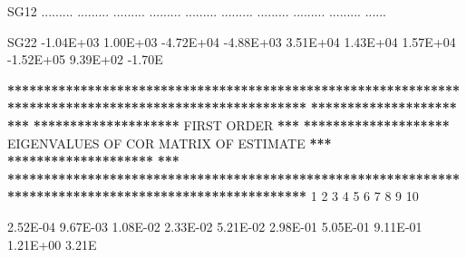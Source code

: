 \documentclass[
  11pt,
  krantz2,
  a4paper]{krantz}
\newenvironment{Shaded}{\begin{snugshade}}{\end{snugshade}}
\newcommand{\DecValTok}[1]{\textcolor[rgb]{0.00,0.00,0.81}{#1}}
\newcommand{\ErrorTok}[1]{\textcolor[rgb]{0.64,0.00,0.00}{\textbf{#1}}}
\newcommand{\FloatTok}[1]{\textcolor[rgb]{0.00,0.00,0.81}{#1}}
\newcommand{\NormalTok}[1]{#1}
\newcommand{\OperatorTok}[1]{\textcolor[rgb]{0.81,0.36,0.00}{\textbf{#1}}}
\newcommand{\StringTok}[1]{\textcolor[rgb]{0.31,0.60,0.02}{#1}}
\theoremstyle{definition}
\theoremstyle{definition}
\theoremstyle{definition}
\theoremstyle{remark}
\begin{document}
\begin{Shaded}
\begin{Highlighting}[]
\NormalTok{SG12   ......... ......... ......... ......... ......... ......... ......... ......... ......... ......}
                                                                                                       
\NormalTok{SG22   }\FloatTok{{-}1.04E+03}  \FloatTok{1.00E+03} \FloatTok{{-}4.72E+04} \FloatTok{{-}4.88E+03}  \FloatTok{3.51E+04}  \FloatTok{1.43E+04}  \FloatTok{1.57E+04} \FloatTok{{-}1.52E+05}  \FloatTok{9.39E+02} \FloatTok{{-}1.70}\NormalTok{E}
                                                                                                       
                                                                                                       
\OperatorTok{**}\ErrorTok{*****************************************************************************************************}
\ErrorTok{********************}\StringTok{                                                                                }\ErrorTok{***}
\ErrorTok{********************}\StringTok{                                   }\NormalTok{FIRST ORDER                                  }\OperatorTok{**}\ErrorTok{*}
\ErrorTok{********************}\StringTok{                      }\NormalTok{EIGENVALUES OF COR MATRIX OF ESTIMATE                     }\OperatorTok{**}\ErrorTok{*}
\ErrorTok{********************}\StringTok{                                                                                }\ErrorTok{***}
\ErrorTok{*******************************************************************************************************}
\StringTok{                                                                                                       }
\StringTok{                                                                                                       }
\StringTok{            }\DecValTok{1}         \DecValTok{2}         \DecValTok{3}         \DecValTok{4}         \DecValTok{5}         \DecValTok{6}         \DecValTok{7}         \DecValTok{8}         \DecValTok{9}        \DecValTok{10}
                                                                                                       
        \FloatTok{2.52E{-}04}  \FloatTok{9.67E{-}03}  \FloatTok{1.08E{-}02}  \FloatTok{2.33E{-}02}  \FloatTok{5.21E{-}02}  \FloatTok{2.98E{-}01}  \FloatTok{5.05E{-}01}  \FloatTok{9.11E{-}01}  \FloatTok{1.21E+00}  \FloatTok{3.21}\NormalTok{E}
                                                                                                       

\end{Highlighting}
\end{Shaded}
\end{document}

